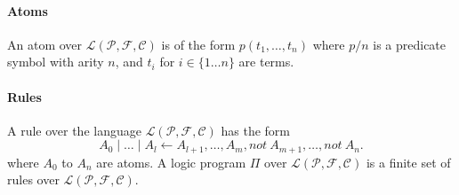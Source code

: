 \documentclass[a4paper,10pt]{article}
\begin{document}
\paragraph{Atoms}
An atom over $\mathcal{L(P, F, C)}$ is of the form $p(t_1, \dots, t_n)$ where $p/n$ is a predicate
symbol with arity $n$, and $t_i$ for $i \in \{1 \dots n\}$ are terms.
\paragraph{Rules}
A rule over the language $\mathcal{L(P,F,C)}$ has the form
$$
A_0 \mid \dots \mid A_l \leftarrow A_{l+1}, \dots, A_m, not\ A_{m+1}, \dots, not\ A_n.
$$
where $A_0$ to $A_n$ are atoms. \newline
A logic program $\Pi$ over $\mathcal{L(P,F,C)}$ is a finite set of rules over $\mathcal{L(P,F,C)}$.
\end{document}

